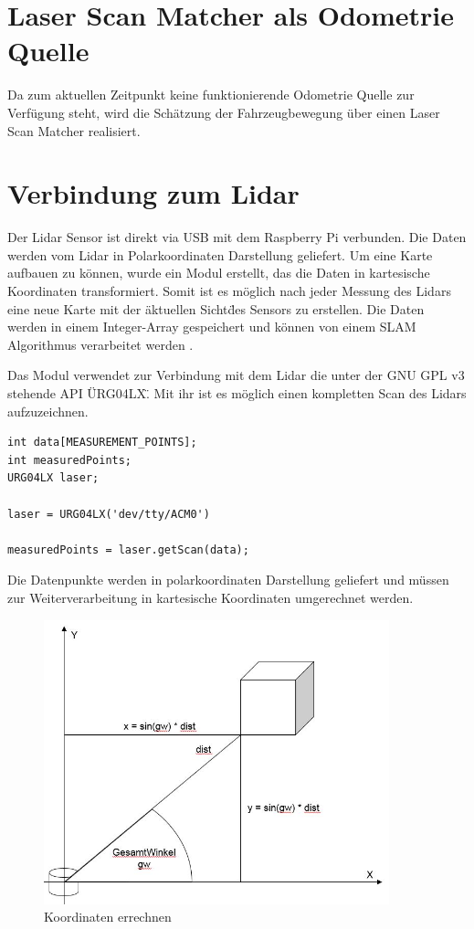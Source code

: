 \section{Laser Scan Matcher als Odometrie Quelle}

Da zum aktuellen Zeitpunkt keine funktionierende Odometrie Quelle zur Verfügung steht, wird die Schätzung der Fahrzeugbewegung über einen Laser Scan Matcher realisiert. 

\section{Verbindung zum Lidar}

Der Lidar Sensor ist direkt via USB mit dem Raspberry Pi verbunden. Die Daten werden vom Lidar in Polarkoordinaten Darstellung geliefert. Um eine Karte aufbauen zu können, wurde ein Modul erstellt, das die Daten in kartesische Koordinaten transformiert. Somit ist es möglich nach jeder Messung des Lidars eine neue Karte mit der \"aktuellen Sicht\" des Sensors zu erstellen. Die Daten werden in einem Integer-Array gespeichert und können von einem SLAM Algorithmus verarbeitet werden . 

Das Modul verwendet zur Verbindung mit dem Lidar die unter der GNU GPL v3 stehende API \"URG04LX\". Mit ihr ist es möglich einen kompletten Scan des Lidars aufzuzeichnen. 

\begin{lstlisting}
int data[MEASUREMENT_POINTS]; 
int measuredPoints;
URG04LX laser;

laser = URG04LX('dev/tty/ACM0')

measuredPoints = laser.getScan(data);

\end{lstlisting}

Die Datenpunkte werden in polarkoordinaten Darstellung geliefert und müssen zur Weiterverarbeitung in kartesische Koordinaten umgerechnet werden. 

\begin{figure}[h]
\begin{center}
\includegraphics[width=10cm]{images/chapter5/LidarKoordRechnung.jpg}
\caption{Koordinaten errechnen}
\label{Koordinaten_errechnen}
\end{center}
\end{figure}

